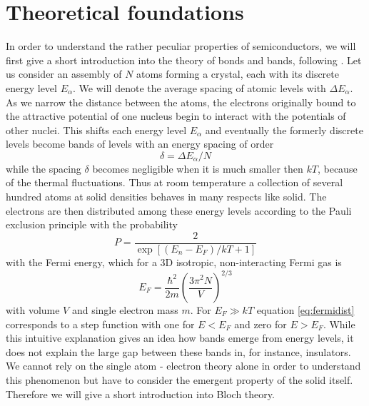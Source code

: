 \section{Theoretical foundations}
In order to understand the rather peculiar properties of semiconductors, we will first give
a short introduction into the theory of bonds and bands, following \cite{phillips2012bonds}.
Let us consider an assembly of $N$ atoms forming a crystal, each with its discrete energy level $E_\alpha$.
We will denote the average spacing of atomic levels with $\Delta E_\alpha$. As we narrow the distance
between the atoms, the electrons originally bound to the attractive potential of one nucleus begin to interact
with the potentials of other nuclei. This shifts each energy level $E_\alpha$ and eventually the formerly
discrete levels become bands of levels with an energy spacing of order
\begin{equation}
    \delta = \Delta E_\alpha / N
\end{equation}
while the spacing $\delta$ becomes negligible when it is much smaller then $kT$, because 
of the thermal fluctuations. Thus at room temperature a collection of several hundred atoms
at solid densities behaves in many respects like solid. The electrons are then distributed among these
energy levels according to the Pauli exclusion principle with the probability
\begin{equation}
    P = \frac{2}{\exp \left [(E_n - E_F)/ kT  + 1\right ]}
    \label{eq:fermidist}
\end{equation}
with the Fermi energy, which for a 3D isotropic, non-interacting Fermi gas is
\begin{equation}
    E_F = \frac{\hbar^2  }{2m} \left ( \frac{3 \pi^2 N}{V} \right )^{2/3}
\end{equation}
with volume $V$ and single electron mass $m$. For $E_F \gg kT$ equation \eqref{eq:fermidist} corresponds
to a step function with one for $E < E_F$ and zero for $E > E_F$. While this intuitive explanation gives
an idea how bands emerge from energy levels, it does not explain the large gap between these bands
in, for instance, insulators. We cannot rely on the single atom - electron theory alone in order to understand
this phenomenon but have to consider the emergent property of the solid itself. Therefore we will 
give a short introduction into Bloch theory.
